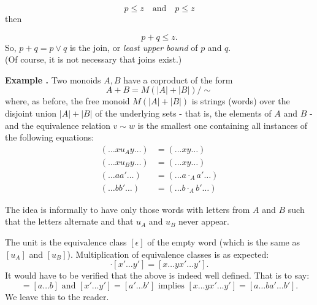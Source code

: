\documentclass[11pt,leqno,landscape,semhelv]{seminar}
\theoremstyle{definition}
\numberwithin{joke}{section}
\numberwithin{thm}{section}
\numberwithin{equation}{section}
\newcommand{\example}[1]{\refstepcounter{thm}\par\medskip
   {\textbf{Example \thethm.} #1} \rmfamily}
\begin{document}
\begin{equation*} 
  p \le z \quad \text{and} \quad p \le z
\end{equation*}
then

\begin{equation*} 
  p + q \le z.
\end{equation*}
So, $p + q = p \vee q$ is the join, or \emph{least upper bound} of $p$ and $q.$\\
(Of course, it is not necessary that joins exist.)

\example{} Two monoids $A, B$ have a coproduct of the form
\begin{equation*} 
  A + B = M(|A| + |B|)/\sim
\end{equation*}
where, as before, the free monoid $M(|A| + |B|)$ is strings (words) over the disjoint union $|A| + |B|$ of the underlying sets - that is, the elements of $A$ and $B$ - and the equivalence relation $v \sim w$ is the smallest one containing all instances of the following equations:
\begin{align} 
  (\ldots x u_A y \ldots) &= (\ldots xy\ldots)\nonumber\\
  (\ldots x u_B y \ldots) &= (\ldots xy\ldots) \label{eq:coprod}\\
  (\ldots aa' \ldots) &= (\ldots a\cdot_Aa'\ldots)\nonumber\\
  (\ldots bb' \ldots) &= (\ldots b\cdot_Ab'\ldots)\nonumber
\end{align}

The idea is informally to have only those words with letters from $A$ and $B$ such that the letters alternate and that $u_A$ and $u_B$ never appear.

The unit is the equivalence class $[\epsilon]$ of the empty word (which is the same as $[u_A]$ and $[u_B]$). Multiplication of equivalence classes is as expected:
\begin{equation*} 
  [x\ldots y]\cdot[x'\ldots y'] = [x\ldots yx' \ldots y'].
\end{equation*}
It would have to be verified that the above is indeed well defined. That is to say:
\begin{equation*} 
  [x\ldots y] = [a\ldots b] \text{ and } [x'\ldots y'] = [a'\ldots b'] \text{ implies } [x\ldots yx' \ldots y'] = [a\ldots ba' \ldots b'].
\end{equation*}
We leave this to the reader.
\end{document}

